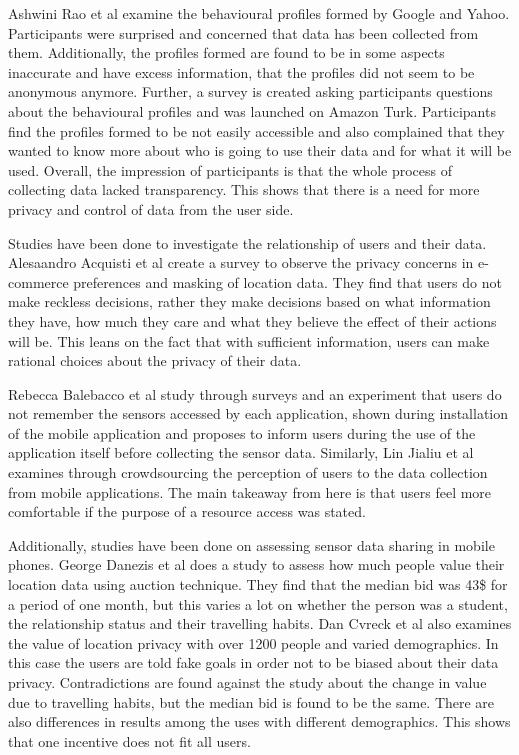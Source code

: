 Ashwini Rao et al \cite{rao2015they} examine the behavioural profiles formed by Google and Yahoo. Participants were surprised and concerned that data has been collected from them. Additionally, the profiles formed are found to be in some aspects inaccurate and have excess information, that the profiles did not seem to be anonymous anymore. Further, a survey is created asking participants questions about the behavioural profiles and was launched on Amazon Turk. Participants find the profiles formed to be not easily accessible and also complained that they wanted to know more about who is going to use their data and for what it will be used. Overall, the impression of participants is that the whole process of collecting data lacked transparency. This shows that there is a need for more privacy and control of data from the user side.

Studies have been done to investigate the relationship of users and their data. Alesaandro Acquisti et al \cite{acquisti2005privacy} create a survey to observe the privacy concerns in e-commerce preferences and masking of location data. They find that users do not make reckless decisions, rather they make decisions based on what information they have, how much they care and what they believe the effect of their actions will be. This leans on the fact that with sufficient information, users can make rational choices about the privacy of their data. 

Rebecca Balebacco et al \cite{balebako2015impact} study through surveys and an experiment that users do not remember the sensors accessed by each application, shown during installation of the mobile application and proposes to inform users during the use of the application itself before collecting the sensor data. Similarly, Lin Jialiu et al \cite{lin2012expectation} examines through crowdsourcing the perception of users to the data collection from mobile applications. The main takeaway from here is that users feel more comfortable if the purpose of a resource access was stated.

Additionally, studies have been done on assessing sensor data sharing in mobile phones. George Danezis et al \cite{danezis2005much} does a study to assess how much people value their location data using auction technique. They find that the median bid was 43\$ for a period of one month, but this varies a lot on whether the person was a student, the relationship status and their travelling habits.  Dan Cvreck et al \cite{cvrcek2006study} also examines the value of location privacy with over 1200 people and varied demographics. In this case the users are told fake goals in order not to be biased about their data privacy. Contradictions are found against the study \cite{danezis2005much} about the change in value due to travelling habits, but the median bid is found to be the same. There are also differences in results among the uses with different demographics. This shows that one incentive does not fit all users.

